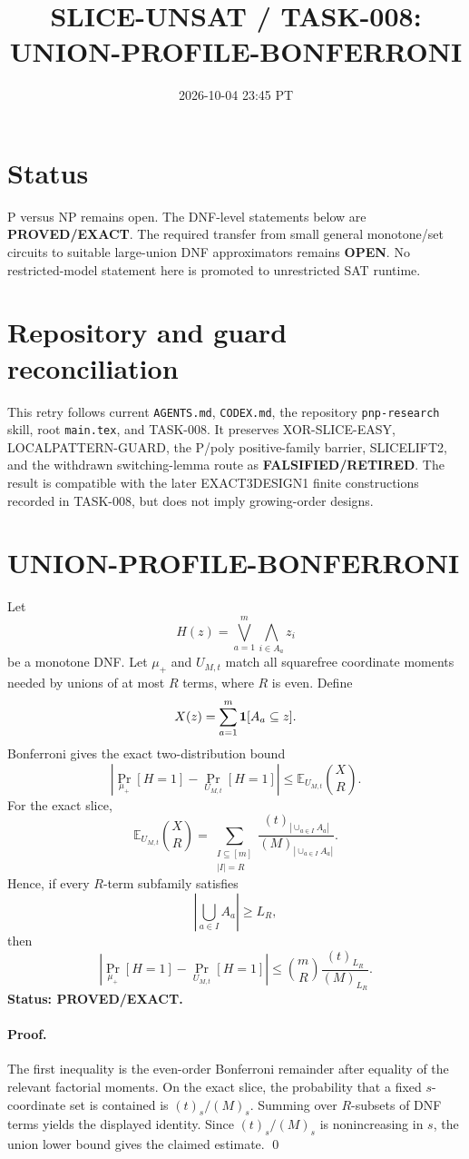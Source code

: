 \documentclass[11pt]{article}
\title{SLICE-UNSAT / TASK-008: UNION-PROFILE-BONFERRONI}
\date{2026-10-04 23:45 PT}
\begin{document}
\maketitle

\section*{Status}
P versus NP remains open. The DNF-level statements below are \textbf{PROVED/EXACT}. The required transfer from small general monotone/set circuits to suitable large-union DNF approximators remains \textbf{OPEN}. No restricted-model statement here is promoted to unrestricted SAT runtime.

\section*{Repository and guard reconciliation}
This retry follows current \texttt{AGENTS.md}, \texttt{CODEX.md}, the repository \texttt{pnp-research} skill, root \texttt{main.tex}, and TASK-008. It preserves XOR-SLICE-EASY, LOCALPATTERN-GUARD, the P/poly positive-family barrier, SLICELIFT2, and the withdrawn switching-lemma route as \textbf{FALSIFIED/RETIRED}. The result is compatible with the later EXACT3DESIGN1 finite constructions recorded in TASK-008, but does not imply growing-order designs.

\section*{UNION-PROFILE-BONFERRONI}
Let
\[
H(z)=\bigvee_{a=1}^{m}\bigwedge_{i\in A_a}z_i
\]
be a monotone DNF. Let $\mu_+$ and $U_{M,t}$ match all squarefree coordinate moments needed by unions of at most $R$ terms, where $R$ is even. Define
\[
X(z)=\sum_{a=1}^m {\bf 1}[A_a\subseteq z].
\]
Bonferroni gives the exact two-distribution bound
\[
\left|\Pr_{\mu_+}[H=1]-\Pr_{U_{M,t}}[H=1]\right|
\leq
\mathbb E_{U_{M,t}}\binom XR.
\]
For the exact slice,
\[
\mathbb E_{U_{M,t}}\binom XR
=
\sum_{\substack{I\subseteq[m]\\ |I|=R}}
\frac{(t)_{\left|\cup_{a\in I}A_a\right|}}
     {(M)_{\left|\cup_{a\in I}A_a\right|}}.
\]
Hence, if every $R$-term subfamily satisfies
\[
\left|\bigcup_{a\in I}A_a\right|\geq L_R,
\]
then
\[
\boxed{
\left|\Pr_{\mu_+}[H=1]-\Pr_{U_{M,t}}[H=1]\right|
\leq
\binom mR\frac{(t)_{L_R}}{(M)_{L_R}}
}.
\]
\textbf{Status: PROVED/EXACT.}

\paragraph{Proof.}
The first inequality is the even-order Bonferroni remainder after equality of the relevant factorial moments. On the exact slice, the probability that a fixed $s$-coordinate set is contained is $(t)_s/(M)_s$. Summing over $R$-subsets of DNF terms yields the displayed identity. Since $(t)_s/(M)_s$ is nonincreasing in $s$, the union lower bound gives the claimed estimate. \qed
\end{document}
